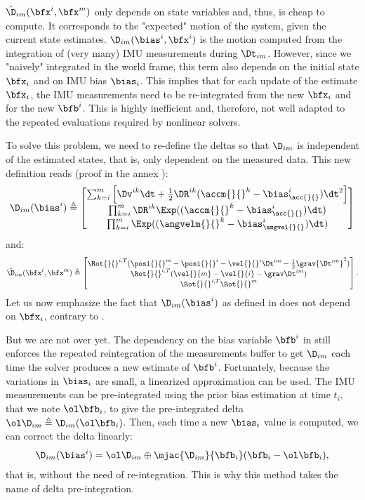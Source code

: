 $\hat\D_{im}(\bfx^i, \bfx^m)$ only depends on state variables and, thus, is cheap to compute. It corresponds to the "expected" motion of the system, given the current state estimates. 
$\D_{im}(\bias^i, \bfx^i)$ is the motion computed from the integration of (very many) IMU measurements during $\Dt_{im}$. However, since we "naively" integrated
in the world frame, this term also depends on the initial state $\bfx_i$ and on IMU bias $\bias_i$. This implies that for each update of the estimate $\bfx_i$, the IMU measurements need to be re-integrated from the new $\bfx_i$ and for the new $\bfb^i$. This is highly inefficient and, therefore, not well adapted to the repeated evaluations required by nonlinear solvers.

To solve this problem, we need to re-define the deltas so that $\D_{im}$ is independent of the estimated states, that is, only dependent on the measured data. This new definition reads \cite{lupton-09, forster2015imu} (proof in the annex ):
%
\begin{align}
    \D_{im}(\bias^i) \triangleq 
    \begin{bmatrix}
    \sum_{k=i}^{m} \Big[\Dv^{ik}\dt +  \frac{1}{2} \DR^{ik} (\accm{}{}^k - \bias_{\acc{}{}}^i)\dt^2 \Big] \\
    \prod_{k=i}^{m} \DR^{ik} \Exp((\accm{}{}^k - \bias_{\acc{}{}}^i)\dt)  \\
    \prod_{k=i}^{m} \Exp((\angvelm{}{}^k - \bias_{\angvel{}{}}^i)\dt)  
    \end{bmatrix}
    \label{eq:imu_delta}
\end{align}
%
and:
%
\begin{align}
    \hat\D_{im}(\bfx^i, \bfx^m) \triangleq 
    \begin{bmatrix}
    \Rot{}{}^{i,T}(\posi{}{}^m - \posi{}{}^i - \vel{}{}^i \Dt^{im} - \frac{1}{2} \grav {\Dt^{im}}^2) \\
    \Rot{}{}^{i,T} (\vel{}{m} - \vel{}{i} - \grav \Dt^{im})  \\
    \Rot{}{}^{i,T} \Rot{}{}^{m}  
    \end{bmatrix}. \label{equ:boxminus-forster}
\end{align}
%
Let us now emphasize the fact that $\D_{im}(\bias^i)$ as defined in  does not depend on $\bfx_i$, contrary to . 

But we are not over yet. The dependency on the bias variable $\bfb^i$ in  still enforces the repeated reintegration of the measurements buffer to get $\D_{im}$ each time the solver produces a new estimate of $\bfb^i$. 
Fortunately, because the variations in $\bias_i$ are small, a linearized approximation can be used. The IMU measurements can be pre-integrated using the prior bias estimation at time $t_i$, that we note $\ol\bfb_i$, to give the pre-integrated delta $\ol\D_{im}\triangleq\D_{im}(\ol\bfb_i)$.
Then, each time a new $\bias_i$ value is computed, we can correct the delta linearly:
%
\begin{align}
    \D_{im}(\bias^i) = \ol\D_{im} \oplus \mjac{\D_{im}}{\bfb_i}(\bfb_i-\ol\bfb_i),
\end{align}
%
that is, without the need of re-integration. This is why this method takes the name of delta pre-integration.

